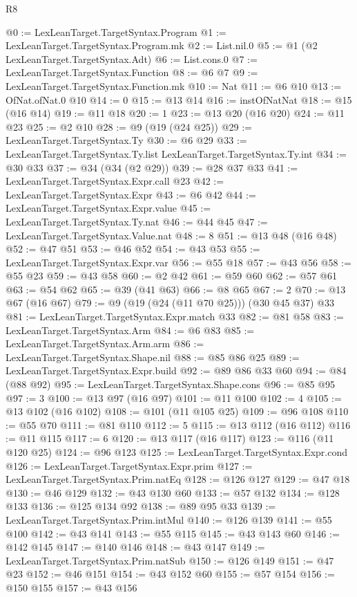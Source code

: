 \begin{lexlean}{R8}
\begin{coremodule}
@0 := LexLeanTarget.TargetSyntax.Program
@1 := LexLeanTarget.TargetSyntax.Program.mk
@2 := List.nil.{0}
@5 := @1 (@2 LexLeanTarget.TargetSyntax.Adt)
@6 := List.cons.{0}
@7 := LexLeanTarget.TargetSyntax.Function
@8 := @6 @7
@9 := LexLeanTarget.TargetSyntax.Function.mk
@10 := Nat
@11 := @6 @10
@13 := OfNat.ofNat.{0} @10
@14 := 0
@15 := @13 @14
@16 := instOfNatNat
@18 := @15 (@16 @14)
@19 := @11 @18
@20 := 1
@23 := @13 @20 (@16 @20)
@24 := @11 @23
@25 := @2 @10
@28 := @9 (@19 (@24 @25))
@29 := LexLeanTarget.TargetSyntax.Ty
@30 := @6 @29
@33 := LexLeanTarget.TargetSyntax.Ty.list LexLeanTarget.TargetSyntax.Ty.int
@34 := @30 @33
@37 := @34 (@34 (@2 @29))
@39 := @28 @37 @33
@41 := LexLeanTarget.TargetSyntax.Expr.call @23
@42 := LexLeanTarget.TargetSyntax.Expr
@43 := @6 @42
@44 := LexLeanTarget.TargetSyntax.Expr.value
@45 := LexLeanTarget.TargetSyntax.Ty.nat
@46 := @44 @45
@47 := LexLeanTarget.TargetSyntax.Value.nat
@48 := 8
@51 := @13 @48 (@16 @48)
@52 := @47 @51
@53 := @46 @52
@54 := @43 @53
@55 := LexLeanTarget.TargetSyntax.Expr.var
@56 := @55 @18
@57 := @43 @56
@58 := @55 @23
@59 := @43 @58
@60 := @2 @42
@61 := @59 @60
@62 := @57 @61
@63 := @54 @62
@65 := @39 (@41 @63)
@66 := @8 @65
@67 := 2
@70 := @13 @67 (@16 @67)
@79 := @9 (@19 (@24 (@11 @70 @25))) (@30 @45 @37) @33
@81 := LexLeanTarget.TargetSyntax.Expr.match @33
@82 := @81 @58
@83 := LexLeanTarget.TargetSyntax.Arm
@84 := @6 @83
@85 := LexLeanTarget.TargetSyntax.Arm.arm
@86 := LexLeanTarget.TargetSyntax.Shape.nil
@88 := @85 @86 @25
@89 := LexLeanTarget.TargetSyntax.Expr.build
@92 := @89 @86 @33 @60
@94 := @84 (@88 @92)
@95 := LexLeanTarget.TargetSyntax.Shape.cons
@96 := @85 @95
@97 := 3
@100 := @13 @97 (@16 @97)
@101 := @11 @100
@102 := 4
@105 := @13 @102 (@16 @102)
@108 := @101 (@11 @105 @25)
@109 := @96 @108
@110 := @55 @70
@111 := @81 @110
@112 := 5
@115 := @13 @112 (@16 @112)
@116 := @11 @115
@117 := 6
@120 := @13 @117 (@16 @117)
@123 := @116 (@11 @120 @25)
@124 := @96 @123
@125 := LexLeanTarget.TargetSyntax.Expr.cond
@126 := LexLeanTarget.TargetSyntax.Expr.prim
@127 := LexLeanTarget.TargetSyntax.Prim.natEq
@128 := @126 @127
@129 := @47 @18
@130 := @46 @129
@132 := @43 @130 @60
@133 := @57 @132
@134 := @128 @133
@136 := @125 @134 @92
@138 := @89 @95 @33
@139 := LexLeanTarget.TargetSyntax.Prim.intMul
@140 := @126 @139
@141 := @55 @100
@142 := @43 @141
@143 := @55 @115
@145 := @43 @143 @60
@146 := @142 @145
@147 := @140 @146
@148 := @43 @147
@149 := LexLeanTarget.TargetSyntax.Prim.natSub
@150 := @126 @149
@151 := @47 @23
@152 := @46 @151
@154 := @43 @152 @60
@155 := @57 @154
@156 := @150 @155
@157 := @43 @156

\end{coremodule}
\end{lexlean}
